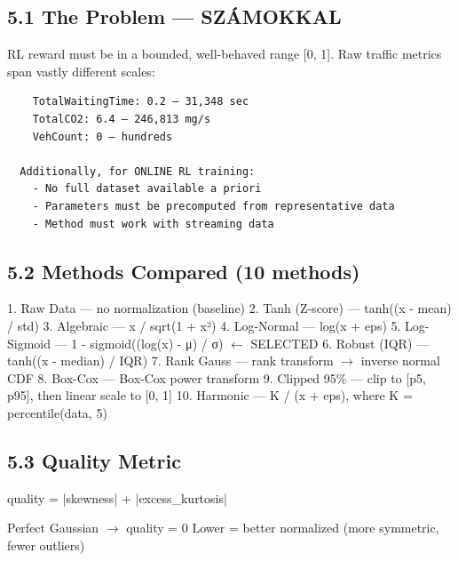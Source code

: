 \documentclass[11pt,a4paper]{article}
\begin{document}
\subsection*{5.1 The Problem — SZÁMOKKAL}
RL reward must be in a bounded, well-behaved range [0, 1].
Raw traffic metrics span vastly different scales:
\vspace{1em}\begin{verbatim}
    TotalWaitingTime: 0.2 — 31,348 sec
    TotalCO2: 6.4 — 246,813 mg/s
    VehCount: 0 — hundreds

  Additionally, for ONLINE RL training:
    - No full dataset available a priori
    - Parameters must be precomputed from representative data
    - Method must work with streaming data

\end{verbatim}
\subsection*{5.2 Methods Compared (10 methods)}
1. Raw Data          — no normalization (baseline)
2. Tanh (Z-score)    — tanh((x - mean) / std)
3. Algebraic          — x / sqrt(1 + x²)
4. Log-Normal         — log(x + eps)
5. Log-Sigmoid        — 1 - sigmoid((log(x) - μ) / σ)     $\leftarrow$ SELECTED
6. Robust (IQR)       — tanh((x - median) / IQR)
7. Rank Gauss         — rank transform $\rightarrow$ inverse normal CDF
8. Box-Cox            — Box-Cox power transform
9. Clipped 95\%        — clip to [p5, p95], then linear scale to [0, 1]
10. Harmonic          — K / (x + eps), where K = percentile(data, 5)

\subsection*{5.3 Quality Metric}
quality = |skewness| + |excess\_kurtosis|

Perfect Gaussian $\rightarrow$ quality = 0
Lower = better normalized (more symmetric, fewer outliers)
\end{document}
